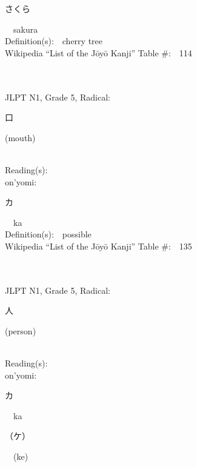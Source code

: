 \begin{multicols}{2}
{\hspace*{2em}}{\begin{CJK}{UTF8}{min} さくら \end{CJK}}\ \ sakura\ \ \\
Definition(s):\ \ cherry tree \\
Wikipedia ``List of the J\=oy\=o Kanji'' Table \#:\ \ 114 \\
\ \ \\
{\fontsize{34pt}{40pt}  }\ \ \\  %
{JLPT N1, Grade 5, Radical:\ \ {\begin{CJK}{UTF8}{min} 口 \end{CJK}} (mouth) } \\
Reading(s):\ \ \\
{\hspace*{1em}}on'yomi:\ \ \\
{\hspace*{2em}}{\begin{CJK}{UTF8}{min} カ \end{CJK}}\ \ ka\ \ \\
Definition(s):\ \ possible \\
Wikipedia ``List of the J\=oy\=o Kanji'' Table \#:\ \ 135 \\
\ \ \\
{\fontsize{34pt}{40pt}  }\ \ \\  %
{JLPT N1, Grade 5, Radical:\ \ {\begin{CJK}{UTF8}{min} 人 \end{CJK}} (person) } \\
Reading(s):\ \ \\
{\hspace*{1em}}on'yomi:\ \ \\
{\hspace*{2em}}{\begin{CJK}{UTF8}{min} カ \end{CJK}}\ \ ka\ \ \\
{\hspace*{2em}}{\begin{CJK}{UTF8}{min} （ケ） \end{CJK}}\ \ (ke)\ \ \\

\end{multicols}
